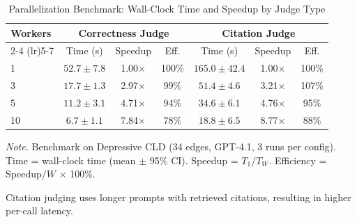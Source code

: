 \begin{table}[H]
\centering
\caption{Parallelization Benchmark: Wall-Clock Time and Speedup by Judge Type}
\label{tab:parallelization}
\begin{threeparttable}
\begin{tabular}{lcccccc}
\toprule
\textbf{Workers} & \multicolumn{3}{c}{\textbf{Correctness Judge}} & \multicolumn{3}{c}{\textbf{Citation Judge}} \\
\cmidrule(lr){2-4} \cmidrule(lr){5-7}
 & Time (s) & Speedup & Eff. & Time (s) & Speedup & Eff. \\
\midrule
1 & $52.7 \pm 7.8$ & 1.00$\times$ & 100\% & $165.0 \pm 42.4$ & 1.00$\times$ & 100\% \\
3 & $17.7 \pm 1.3$ & 2.97$\times$ & 99\% & $51.4 \pm 4.6$ & 3.21$\times$ & 107\% \\
5 & $11.2 \pm 3.1$ & 4.71$\times$ & 94\% & $34.6 \pm 6.1$ & 4.76$\times$ & 95\% \\
10 & $6.7 \pm 1.1$ & 7.84$\times$ & 78\% & $18.8 \pm 6.5$ & 8.77$\times$ & 88\% \\
\bottomrule
\end{tabular}
\begin{tablenotes}
\small
\item \textit{Note.} Benchmark on Depressive CLD (34 edges, GPT-4.1, 3 runs per config). Time = wall-clock time (mean $\pm$ 95\% CI). Speedup = $T_1/T_W$. Efficiency = Speedup/$W$ $\times$ 100\%.
\item Citation judging uses longer prompts with retrieved citations, resulting in higher per-call latency.
\end{tablenotes}
\end{threeparttable}
\end{table}
